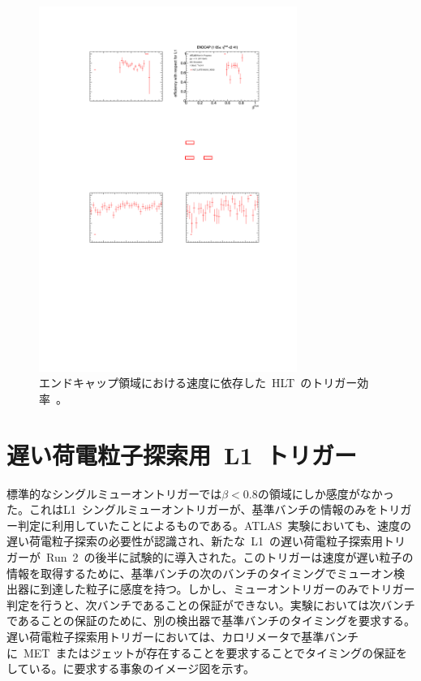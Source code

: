 \begin{figure}[H]
        \centering   
        \includegraphics[width=0.75\textwidth,page=1]{img/pdf3/hlt.pdf}
        \caption[エンドキャップ領域における速度に依存した HLT のトリガー効率]{エンドキャップ領域における速度に依存した~HLT~のトリガー効率~\cite{MT:01}。}
        \label{fig:hlt}
\end{figure}

\section{遅い荷電粒子探索用~L1~トリガー}
\label{sec:latemu}
標準的なシングルミューオントリガーでは$\beta<0.8$の領域にしか感度がなかった。これはL1~シングルミューオントリガーが、基準バンチの情報のみをトリガー判定に利用していたことによるものである。ATLAS~実験においても、速度の遅い荷電粒子探索の必要性が認識され、新たな~L1~の遅い荷電粒子探索用トリガーが~Run~2~の後半に試験的に導入された。このトリガーは速度が遅い粒子の情報を取得するために、基準バンチの次のバンチのタイミングでミューオン検出器に到達した粒子に感度を持つ。しかし、ミューオントリガーのみでトリガー判定を行うと、次バンチであることの保証ができない。実験においては次バンチであることの保証のために、別の検出器で基準バンチのタイミングを要求する。遅い荷電粒子探索用トリガーにおいては、カロリメータで基準バンチに~MET~またはジェットが存在することを要求することでタイミングの保証をしている。に要求する事象のイメージ図を示す。

